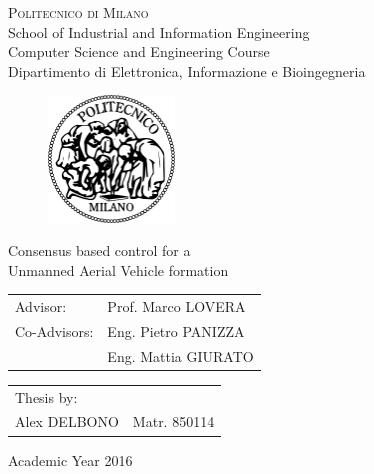 \begin{titlepage}

\begin{center}
\Large{\textsc{Politecnico di Milano}}\\
\Large{School of Industrial and Information Engineering}\\
\large{Computer Science and Engineering Course}\\
\large{Dipartimento di Elettronica, Informazione e Bioingegneria}
\par
\end{center}

\vspace{0.2cm}

\begin{center}
\begin{figure}[h]
\centering{}
\includegraphics[width=0.3\textwidth]{title-page/logo-polimi}
\end{figure}
\par
\end{center}

\begin{center}
\LARGE{Consensus based control for a \\Unmanned Aerial Vehicle formation}
\vspace{1.0cm}
\par
\end{center}

\begin{flushleft}
\begin{tabular}{ll}
Advisor:  & Prof. Marco LOVERA\tabularnewline
Co-Advisors:  & Eng. Pietro PANIZZA\tabularnewline
              & Eng. Mattia GIURATO\tabularnewline
\end{tabular}\vspace{0.3cm}
\par
\end{flushleft}

\begin{flushright}
\begin{tabular}{ll}
Thesis by: & \tabularnewline
Alex DELBONO & Matr. 850114\tabularnewline
\end{tabular}\vspace{1cm}
\par
\end{flushright}

\begin{center}
{\large{}Academic Year 2016}
\par
\end{center}{\large \par}

\end{titlepage}
